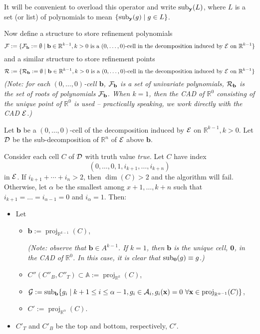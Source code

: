 \documentclass[
]{book}
\theoremstyle{definition}
\theoremstyle{definition}
\theoremstyle{definition}
\theoremstyle{definition}
\theoremstyle{remark}
\begin{document}
It will be convenient to overload this operator and write \({\rm sub}_{\mathbf{y}} (L)\), where \(L\) is a set (or list) of polynomials to mean \(\{ {\rm sub}_{\mathbf{y}} (g) \mid g \in L \}\).

Now define a structure to store refinement polynomials
\[
{\cal F} := \{ {\cal F}_{\mathbf{b}} := \emptyset \mid \mathbf{b} \in \mathbb{R}^{k-1}, k > 0 \text{ is a } (0,\ldots,0) \text{-cell in the decomposition induced by } {\cal E} \text{ on } \mathbb{R}^{k-1} \}
\]
and a similar structure to store refinement points
\[
{\cal R} := \{ {\cal R}_{\mathbf{b}} := \emptyset \mid \mathbf{b} \in \mathbb{R}^{k-1}, k > 0 \text{ is a } (0,\ldots,0) \text{-cell in the decomposition induced by } {\cal E} \text{ on } \mathbb{R}^{k-1} \}
\]
\emph{(Note: for each \((0,\ldots,0)\)-cell \(\mathbf{b}\), \({\cal F}_\mathbf{b}\) is a set of univariate polynomials, \({\cal R}_{\mathbf{b}}\) is the set of roots of polynomials \({\cal F}_\mathbf{b}\). When \(k=1\), then the CAD of \(\mathbb{R}^0\) consisting of the unique point of \(\mathbb{R}^0\) is used -- practically speaking, we work directly with the CAD \(\cal E\).)}

Let \(\mathbf{b}\) be a \((0,\ldots,0)\)-cell of the decomposition induced by \(\cal E\) on \(\mathbb{R}^{k-1}, k > 0\). Let \(\cal D\) be the sub-decomposition of \(\mathbb{R}^n\) of \(\cal E\) above \(\mathbf{b}\).

Consider each cell \(C\) of \(\cal D\) with truth value \emph{true}. Let \(C\) have index
\[
(0,\ldots,0,1,i_{k+1},\ldots,i_{k+n})
\]
in \(\cal E\). If \(i_{k+1} + \cdots + i_n > 2\), then \(\dim(C) > 2\) and the algorithm will fail. Otherwise, let \(\alpha\) be the smallest among \(x+1,\ldots,k+n\) such that \(i_{k+1} = \ldots = i_{\alpha - 1} = 0\) and \(i_\alpha = 1\).
Then:

\begin{itemize}
\item
  Let

  \begin{itemize}
  \item
    \(\mathbf{b} := {\operatorname{proj}_{\mathbb{R}^{k-1}}}(C)\),

    \emph{(Note: observe that \(\mathbf{b} \in A^{k-1}\). If \(k = 1\), then \(\mathbf{b}\) is the unique cell, \(\mathbf{0}\), in the CAD of \(\mathbb{R}^0\). In this case, it is clear that \({\rm sub}_\mathbf{0} (g) \equiv g\).)}
  \item
    \(C'' (C''_B, C''_T) \subset \mathbb{A}:= {\operatorname{proj}_{\mathbb{R}^{k}}}(C)\),
  \item
    \({\cal G} := {\rm sub}_{\mathbf{b}} \{ g_i \mid k+1 \le i \le \alpha - 1, g_i \in {\cal A}_i, g_i(\mathbf{x}) = 0 \ \forall \mathbf{x} \in {\operatorname{proj}_{\mathbb{R}^{\alpha-1}}}(C) \}\),
  \item
    \(C' := {\operatorname{proj}_{\mathbb{R}^{\alpha}}}(C)\).
  \end{itemize}
\item
  \(C'_T\) and \(C'_B\) be the top and bottom, respectively, \(C'\).
\end{itemize}
\end{document}
